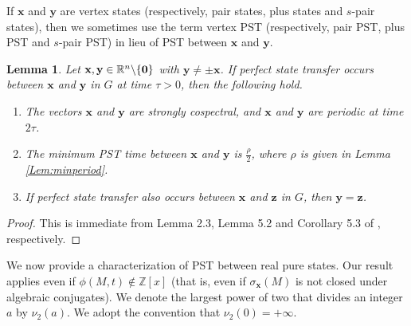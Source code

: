 \documentclass[11pt]{article}
\newtheorem{lemma}[theorem]{Lemma}
\newcommand{\zero}{{\bf{0}}}
\newcommand{\bx}{\mathbf x}
\newcommand{\by}{\mathbf y}
\newcommand{\bz}{\mathbf z}
\def\R{\mathbb{R}}
\begin{document}
If $\bx$ and $\by$ are vertex states (respectively, pair states, plus states and $s$-pair states), then we sometimes use the term vertex PST (respectively, pair PST, plus PST and $s$-pair PST) in lieu of PST between $\bx$ and $\by$. 

\begin{lemma}
\label{Lem:pstnec}
Let $\bx,\by\in \R^n\backslash\{\zero\}$ with $\by\neq\pm \bx$. If perfect state transfer occurs between $\bx$ and $\by$ in $G$ at time $\tau>0$, then the following hold.
\begin{enumerate}
    \item The vectors $\bx$ and $\by$ are strongly cospectral, and $\bx$ and $\by$ are periodic at time $2\tau$.
    \item The minimum PST time between $\bx$ and $\by$ is $\frac{\rho}{2}$, where $\rho$ is given in Lemma \ref{Lem:minperiod}.
    \item If perfect state transfer also occurs between $\bx$ and $\bz$ in $G$, then $\by=\bz$.
\end{enumerate}
\end{lemma}

\begin{proof}
This is immediate from Lemma 2.3, Lemma 5.2 and Corollary 5.3 of \cite{godsil2017real}, respectively.
\end{proof}

We now provide a characterization of PST between real pure states. Our result applies even if $\phi(M,t)\notin\mathbb{Z}[x]$ (that is, even if $\sigma_{\bx}(M)$ is not closed under algebraic conjugates). We denote the largest power of two that divides an integer $a$ by $\nu_2(a)$. We adopt the convention that $\nu_2(0)=+\infty$.
\end{document}

